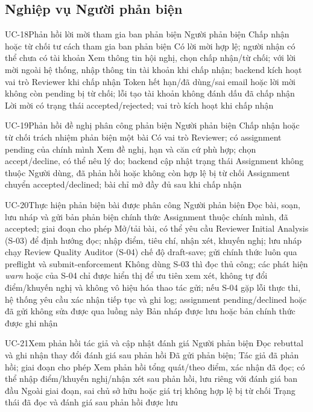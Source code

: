 \subsection{Nghiệp vụ Người phản biện}

\UseCaseSpec
{UC-18}{Phản hồi lời mời tham gia ban phản biện}
{Người phản biện}
{Chấp nhận hoặc từ chối tư cách tham gia ban phản biện}
{Có lời mời hợp lệ; người nhận có thể chưa có tài khoản}
{Xem thông tin hội nghị, chọn chấp nhận/từ chối; với lời mời ngoài hệ thống, nhập thông tin tài khoản khi chấp nhận; backend kích hoạt vai trò Reviewer khi chấp nhận}
{Token hết hạn/đã dùng/sai email hoặc lời mời không còn pending bị từ chối; lỗi tạo tài khoản không đánh dấu đã chấp nhận}
{Lời mời có trạng thái accepted/rejected; vai trò kích hoạt khi chấp nhận}

\UseCaseSpec
{UC-19}{Phản hồi đề nghị phân công phản biện}
{Người phản biện}
{Chấp nhận hoặc từ chối trách nhiệm phản biện một bài}
{Có vai trò Reviewer; có assignment pending của chính mình}
{Xem đề nghị, hạn và căn cứ phù hợp; chọn accept/decline, có thể nêu lý do; backend cập nhật trạng thái}
{Assignment không thuộc Người dùng, đã phản hồi hoặc không còn hợp lệ bị từ chối}
{Assignment chuyển accepted/declined; bài chỉ mở đầy đủ sau khi chấp nhận}

\UseCaseSpec
{UC-20}{Thực hiện phản biện bài được phân công}
{Người phản biện}
{Đọc bài, soạn, lưu nháp và gửi bản phản biện chính thức}
{Assignment thuộc chính mình, đã accepted; giai đoạn cho phép}
{Mở/tải bài, có thể yêu cầu Reviewer Initial Analysis (S-03) để định hướng đọc; nhập điểm, tiêu chí, nhận xét, khuyến nghị; lưu nháp chạy Review Quality Auditor (S-04) chế độ draft-save; gửi chính thức luôn qua preflight và submit-enforcement}
{Không dùng S-03 thì đọc thủ công; các phát hiện \textit{warn} hoặc  của S-04 chỉ được hiển thị để ưu tiên xem xét, không tự đổi điểm/khuyến nghị và không vô hiệu hóa thao tác gửi; nếu S-04 gặp lỗi thực thi, hệ thống yêu cầu xác nhận tiếp tục và ghi log; assignment pending/declined hoặc đã gửi không sửa được qua luồng này}
{Bản nháp được lưu hoặc bản chính thức được ghi nhận}

\UseCaseSpec
{UC-21}{Xem phản hồi tác giả và cập nhật đánh giá}
{Người phản biện}
{Đọc rebuttal và ghi nhận thay đổi đánh giá sau phản hồi}
{Đã gửi phản biện; Tác giả đã phản hồi; giai đoạn cho phép}
{Xem phản hồi tổng quát/theo điểm, xác nhận đã đọc; có thể nhập điểm/khuyến nghị/nhận xét sau phản hồi, lưu riêng với đánh giá ban đầu}
{Ngoài giai đoạn, sai chủ sở hữu hoặc giá trị không hợp lệ bị từ chối}
{Trạng thái đã đọc và đánh giá sau phản hồi được lưu}


